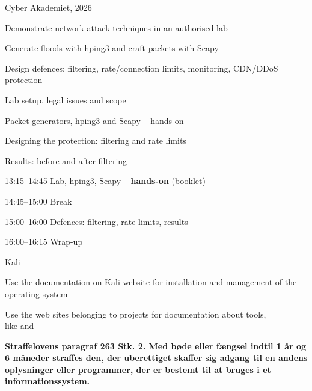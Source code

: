 \documentclass[Screen16to9,17pt]{foils}
\begin{document}
{Cyber Akademiet, 2026}

\begin{list2}
\item Demonstrate network-attack techniques in an authorised lab
\item Generate floods with hping3 and craft packets with Scapy
\item Design defences: filtering, rate/connection limits, monitoring, CDN/DDoS protection
\end{list2}

\begin{list2}
\item Lab setup, legal issues and scope
\item Packet generators, hping3 and Scapy -- hands-on
\item Designing the protection: filtering and rate limits
\item Results: before and after filtering
\end{list2}

\begin{list2}
\item 13:15--14:45 Lab, hping3, Scapy -- \textbf{hands-on} (booklet)
\item 14:45--15:00 Break
\item 15:00--16:00 Defences: filtering, rate limits, results
\item 16:00--16:15 Wrap-up
\end{list2}



\begin{list1}
\item Kali 
\item Use the documentation on Kali website for installation and management of the operating system
\item Use the web sites belonging to projects for documentation about tools, \\
like  and 
\end{list1}


{\bfseries Straffelovens paragraf 263 Stk. 2. Med bøde eller fængsel indtil 1 år og 6 måneder straffes den, der uberettiget skaffer sig adgang til en andens oplysninger eller programmer, der er bestemt til at bruges i et informationssystem. }
\end{document}
